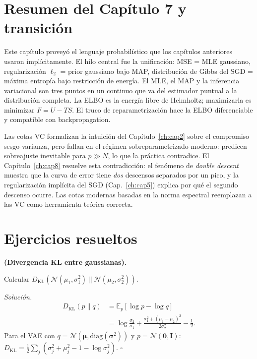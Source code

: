 \section{Resumen del Capítulo 7 y transición}
\label{sec:resumen7}

Este capítulo proveyó el lenguaje probabilístico que los capítulos
anteriores usaron implícitamente. El hilo central fue la unificación: MSE
= MLE gaussiano, regularización $\ell_2$ = prior gaussiano bajo MAP,
distribución de Gibbs del SGD = máxima entropía bajo restricción de
energía. El MLE, el MAP y la inferencia variacional son tres puntos en un
continuo que va del estimador puntual a la distribución completa. La ELBO
es la energía libre de Helmholtz; maximizarla es minimizar $F = U - TS$.
El truco de reparametrización hace la ELBO diferenciable y compatible con
backpropagation.

Las cotas VC formalizan la intuición del Capítulo~\ref{ch:cap2} sobre el
compromiso sesgo-varianza, pero fallan en el régimen sobreparametrizado
moderno: predicen sobreajuste inevitable para $p \gg N$, lo que la práctica
contradice. El Capítulo~\ref{ch:cap8} resuelve esta contradicción: el
fenómeno de \textit{double descent} muestra que la curva de error tiene
\emph{dos} descensos separados por un pico, y la regularización implícita
del SGD (Cap.~\ref{ch:cap5}) explica por qué el segundo descenso ocurre.
Las cotas modernas basadas en la norma espectral reemplazan a las VC como
herramienta teórica correcta.

\section*{Ejercicios resueltos}

\begin{ejercicio}
\label{ej:kl_gaussianas}
\textbf{(Divergencia KL entre gaussianas).}

Calcular $D_{\text{KL}}(\mathcal{N}(\mu_1,\sigma_1^2)\|
\mathcal{N}(\mu_2,\sigma_2^2))$.

\medskip\noindent\textit{Solución.}
\begin{align*}
  D_{\text{KL}}(p\|q)
  &= \mathbb{E}_p[\log p - \log q] \\
  &= \log\frac{\sigma_2}{\sigma_1}
  + \frac{\sigma_1^2 + (\mu_1-\mu_2)^2}{2\sigma_2^2} - \frac{1}{2}.
\end{align*}
Para el VAE con $q = \mathcal{N}(\bm{\mu},\text{diag}(\bm{\sigma}^2))$
y $p = \mathcal{N}(\bm{0},\bm{I})$:
$D_{\text{KL}} = \frac{1}{2}\sum_j(\sigma_j^2+\mu_j^2-1-\log\sigma_j^2)$.
$\square$
\end{ejercicio}

